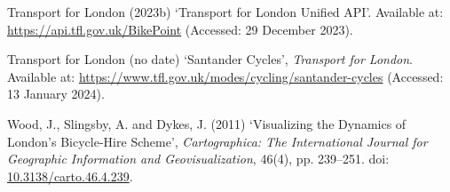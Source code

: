 \documentclass[
  a4paper,
  DIV=11,
  numbers=noendperiod]{scrartcl}
\newlength{\cslhangindent}
\newlength{\cslentryspacingunit} %
\newenvironment{CSLReferences}[2] %
 {%
  \setlength{\parindent}{0pt}
  \ifodd #1
  \let\oldpar\par
  \def\par{\hangindent=\cslhangindent\oldpar}
  \fi
  \setlength{\parskip}{#2\cslentryspacingunit}
 }%
 {}
\begin{document}
\begin{CSLReferences}{0}{0}
\leavevmode{}%
Transport for London (2023b) {`Transport for {London} {Unified} {API}'}.
Available at: \url{https://api.tfl.gov.uk/BikePoint} (Accessed: 29
December 2023).

\leavevmode{}%
Transport for London (no date) {`Santander {Cycles}'}, \emph{Transport
for London}. Available at:
\url{https://www.tfl.gov.uk/modes/cycling/santander-cycles} (Accessed:
13 January 2024).

\leavevmode{}%
Wood, J., Slingsby, A. and Dykes, J. (2011) {`Visualizing the {Dynamics}
of {London}'s {Bicycle}-{Hire} {Scheme}'}, \emph{Cartographica: The
International Journal for Geographic Information and Geovisualization},
46(4), pp. 239--251. doi:
\href{https://doi.org/10.3138/carto.46.4.239}{10.3138/carto.46.4.239}.

\end{CSLReferences}
\end{document}
